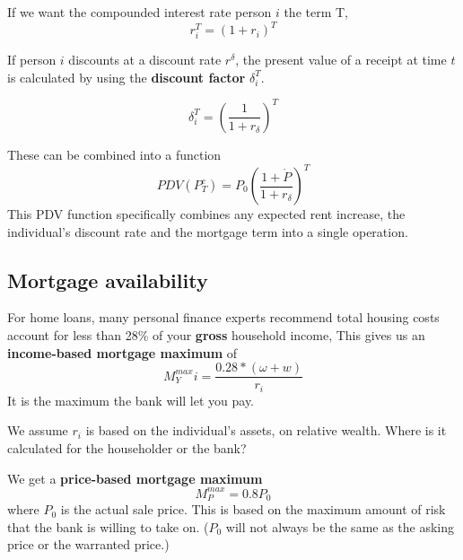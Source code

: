 If we want the compounded interest rate person $i$ the term T,
\[r_i^T=(1+r_i)^T\]

If person $i$  discounts at a discount rate $r^\delta$, the present value of a receipt at time $t$ is calculated by using the \textbf{discount factor} $\delta_i^T$.

\[\delta_i^T= \left( \frac{1}{1+r_\delta} \right)^T \]
 
These can be combined into a function %
\[ PDV(P^e_T)=P_0\left( \frac{1+\dot P}{1+r_\delta} \right)^T \]
This PDV function specifically combines any expected rent increase, the individual's discount rate and the mortgage term into a single operation.

\subsection{Mortgage availability}
For home loans, many personal finance experts recommend total housing costs account for less than 28\% of your \textbf{gross} household income, This gives us an \textbf{income-based  mortgage maximum} of \[M^{max}_Yi = \frac{0.28*(\omega+w)}{r_i}\] It is the maximum the bank will let you pay.

We assume $r_i$ is based on the individual's assets, on relative wealth. Where is it calculated for the householder or the bank?

We get a \textbf{price-based mortgage maximum} \[M^{max}_P = 0.8P_0\] where $P_0$ is the actual sale price. This is based on the maximum amount of risk that the bank is willing to take on. ($P_0$  will not always be the same as the asking price or the warranted price.)
